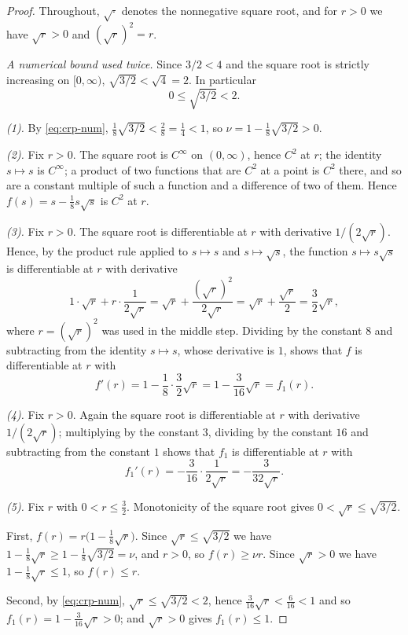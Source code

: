 \begin{proof}
Throughout, $\sqrt{\cdot}$ denotes the nonnegative square root, and for $r>0$ we
have $\sqrt r>0$ and $(\sqrt r)^2=r$.

\emph{A numerical bound used twice.} Since $3/2<4$ and the square root is
strictly increasing on $[0,\infty)$, $\sqrt{3/2}<\sqrt4=2$. In particular
\begin{equation}\label{eq:crp-num}
  0\le\sqrt{3/2}<2 .
\end{equation}

\emph{(1).} By \eqref{eq:crp-num}, $\tfrac18\sqrt{3/2}<\tfrac28=\tfrac14<1$, so
$\nu=1-\tfrac18\sqrt{3/2}>0$.

\emph{(2).} Fix $r>0$. The square root is $C^\infty$ on $(0,\infty)$, hence
$C^2$ at $r$; the identity $s\mapsto s$ is $C^\infty$; a product of two
functions that are $C^2$ at a point is $C^2$ there, and so are a constant
multiple of such a function and a difference of two of them. Hence
$f(s)=s-\tfrac18 s\sqrt s$ is $C^2$ at $r$.

\emph{(3).} Fix $r>0$. The square root is differentiable at $r$ with derivative
$1/(2\sqrt r)$. Hence, by the product rule applied to $s\mapsto s$ and
$s\mapsto\sqrt s$, the function $s\mapsto s\sqrt s$ is differentiable at $r$
with derivative
\[
  1\cdot\sqrt r+r\cdot\frac1{2\sqrt r}
   =\sqrt r+\frac{(\sqrt r)^2}{2\sqrt r}
   =\sqrt r+\frac{\sqrt r}{2}
   =\frac32\sqrt r ,
\]
where $r=(\sqrt r)^2$ was used in the middle step. Dividing by the constant $8$
and subtracting from the identity $s\mapsto s$, whose derivative is $1$, shows
that $f$ is differentiable at $r$ with
\[
  f'(r)=1-\frac1 8\cdot\frac32\sqrt r=1-\frac3{16}\sqrt r=f_1(r).
\]

\emph{(4).} Fix $r>0$. Again the square root is differentiable at $r$ with
derivative $1/(2\sqrt r)$; multiplying by the constant $3$, dividing by the
constant $16$ and subtracting from the constant $1$ shows that $f_1$ is
differentiable at $r$ with
\[
  f_1'(r)=-\frac{3}{16}\cdot\frac1{2\sqrt r}=-\frac3{32\sqrt r} .
\]

\emph{(5).} Fix $r$ with $0<r\le\tfrac32$. Monotonicity of the square root gives
$0<\sqrt r\le\sqrt{3/2}$.

First, $f(r)=r\bigl(1-\tfrac18\sqrt r\bigr)$. Since $\sqrt r\le\sqrt{3/2}$ we
have $1-\tfrac18\sqrt r\ge1-\tfrac18\sqrt{3/2}=\nu$, and $r>0$, so
$f(r)\ge\nu r$. Since $\sqrt r>0$ we have $1-\tfrac18\sqrt r\le1$, so
$f(r)\le r$.

Second, by \eqref{eq:crp-num}, $\sqrt r\le\sqrt{3/2}<2$, hence
$\tfrac3{16}\sqrt r<\tfrac6{16}<1$ and so $f_1(r)=1-\tfrac3{16}\sqrt r>0$;
and $\sqrt r>0$ gives $f_1(r)\le1$.
\end{proof}
